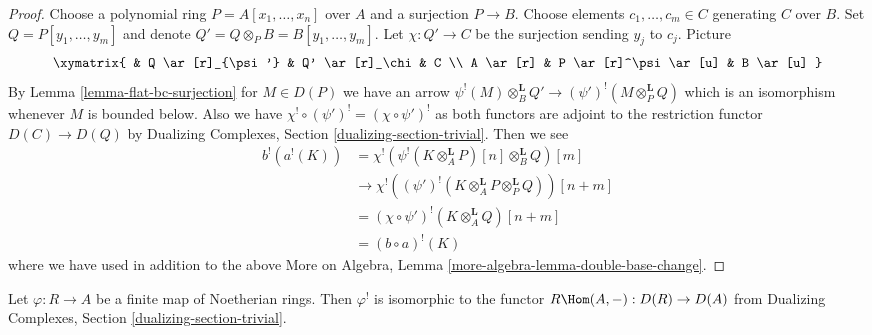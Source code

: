 \begin{proof}
Choose a polynomial ring $P = A[x_1, \ldots, x_n]$ over $A$
and a surjection $P \to B$. Choose elements $c_1, \ldots, c_m \in C$
generating $C$ over $B$. Set $Q = P[y_1, \ldots, y_m]$ and
denote $Q' = Q \otimes_P B = B[y_1, \ldots, y_m]$.
Let $\chi : Q' \to C$ be the surjection sending $y_j$ to $c_j$.
Picture
$$
\xymatrix{
& Q \ar[r]_{\psi'} & Q' \ar[r]_\chi & C \\
A \ar[r] & P \ar[r]^\psi \ar[u] & B \ar[u]
}
$$
By Lemma \ref{lemma-flat-bc-surjection} for $M \in D(P)$ we have an arrow
$\psi^!(M) \otimes_B^\mathbf{L} Q' \to (\psi')^!(M \otimes_P^\mathbf{L} Q)$
which is an isomorphism whenever $M$ is bounded below. Also
we have $\chi^! \circ (\psi')^! = (\chi \circ \psi')^!$ as both
functors are adjoint to the restriction functor $D(C) \to D(Q)$
by Dualizing Complexes, Section \ref{dualizing-section-trivial}. Then we see
\begin{align*}
b^!(a^!(K))
& =
\chi^!(\psi^!(K \otimes_A^\mathbf{L} P)[n] \otimes_B^\mathbf{L} Q)[m] \\
& \to
\chi^!((\psi')^!(K \otimes_A^\mathbf{L} P \otimes_P^\mathbf{L} Q))[n + m] \\
& =
(\chi \circ \psi')^!(K\otimes_A^\mathbf{L} Q)[n + m] \\
& =
(b \circ a)^!(K)
\end{align*}
where we have used in addition to the above
More on Algebra, Lemma \ref{more-algebra-lemma-double-base-change}.
\end{proof}

\begin{lemma}
\label{lemma-upper-shriek-finite}
Let $\varphi : R \to A$ be a finite map of Noetherian rings.
Then $\varphi^!$ is isomorphic to the functor
$R\Hom(A, -) : D(R) \to D(A)$ from
Dualizing Complexes, Section \ref{dualizing-section-trivial}.
\end{lemma}

